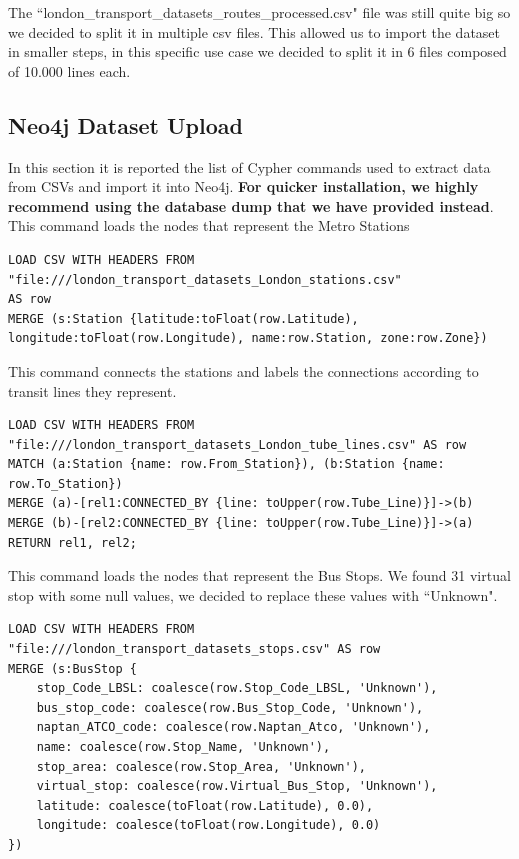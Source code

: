 \documentclass{Configuration_Files/PoliMi3i_thesis}
\begin{document}
The ``london\_transport\_datasets\_routes\_processed.csv" file was still quite big so we decided to split it in multiple csv files. This allowed us to import the dataset in smaller steps, in this specific use case we decided to split it in 6 files composed of 10.000 lines each.

\subsection{Neo4j Dataset Upload}


In this section it is reported the list of Cypher commands used to extract data from
CSVs and import it into Neo4j. \textbf{For quicker installation, we highly recommend using the database dump that we have provided instead}.\\

This command loads the nodes that represent the Metro Stations
\begin{lstlisting}[language=Cypher]
LOAD CSV WITH HEADERS FROM "file:///london_transport_datasets_London_stations.csv"
AS row
MERGE (s:Station {latitude:toFloat(row.Latitude), longitude:toFloat(row.Longitude), name:row.Station, zone:row.Zone})
\end{lstlisting}

This command connects the stations and labels the connections according to transit lines they represent.

\begin{lstlisting}[language=Cypher]
LOAD CSV WITH HEADERS FROM "file:///london_transport_datasets_London_tube_lines.csv" AS row
MATCH (a:Station {name: row.From_Station}), (b:Station {name: row.To_Station})
MERGE (a)-[rel1:CONNECTED_BY {line: toUpper(row.Tube_Line)}]->(b)
MERGE (b)-[rel2:CONNECTED_BY {line: toUpper(row.Tube_Line)}]->(a)
RETURN rel1, rel2;
\end{lstlisting}

This command loads the nodes that represent the Bus Stops. We found 31 virtual stop with some null values, we decided to replace these values with ``Unknown".

\begin{lstlisting}[language=Cypher]
LOAD CSV WITH HEADERS FROM "file:///london_transport_datasets_stops.csv" AS row
MERGE (s:BusStop {
    stop_Code_LBSL: coalesce(row.Stop_Code_LBSL, 'Unknown'),
    bus_stop_code: coalesce(row.Bus_Stop_Code, 'Unknown'),
    naptan_ATCO_code: coalesce(row.Naptan_Atco, 'Unknown'),
    name: coalesce(row.Stop_Name, 'Unknown'),
    stop_area: coalesce(row.Stop_Area, 'Unknown'),
    virtual_stop: coalesce(row.Virtual_Bus_Stop, 'Unknown'),
    latitude: coalesce(toFloat(row.Latitude), 0.0),
    longitude: coalesce(toFloat(row.Longitude), 0.0)
})
\end{lstlisting}
\end{document}
